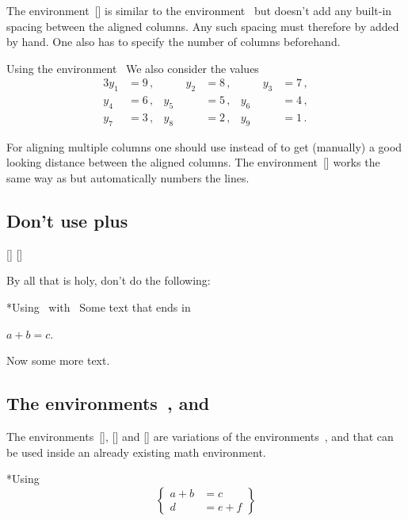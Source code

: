 The environment~[\envname] is similar to the environment~ but doesn’t add any built-in spacing between the aligned columns.
Any such spacing must therefore by added by hand.
One also has to specify the number of columns beforehand.
\begin{showlatex}{Using the environment~}
We also consider the values
\begin{alignat*}{3}
  y_1 &= 9 \,,  &\qquad   y_2 &= 8 \,,  &\qquad   y_3 &= 7 \,,  \\
  y_4 &= 6 \,,  &         y_5 &= 5 \,,  &         y_6 &= 4 \,,  \\
  y_7 &= 3 \,,  &         y_8 &= 2 \,,  &         y_9 &= 1 \,.
\end{alignat*}
\end{showlatex}
For aligning multiple columns one should use  instead of  to get (manually) a good looking distance between the aligned columns.
The environment~[\envname] works the same way as  but automatically numbers the lines.



\subsection{Don’t use  plus \inlinecodetitle{\$ \$}}
[\envname]
\massindex{\$ \$}[\inlinecode]

By all that is holy, don’t do the following:
\begin{showlatex}*{Using~ with~\inlinecode{\$ \$}}
Some text that ends in
\begin{center}
  $a + b = c$.
\end{center}
Now some more text.
\end{showlatex}



\subsection{The environments~,  and }

The environments~[\envname], [\envname] and [\envname] are variations of the environments~,  and  that can be used inside an already existing math environment.
\begin{showlatex}*{Using }
\[
  \left\{
    \begin{aligned}
      a + b &= c      \\
      d     &= e + f
    \end{aligned}
  \right\}
\]
\end{showlatex}



